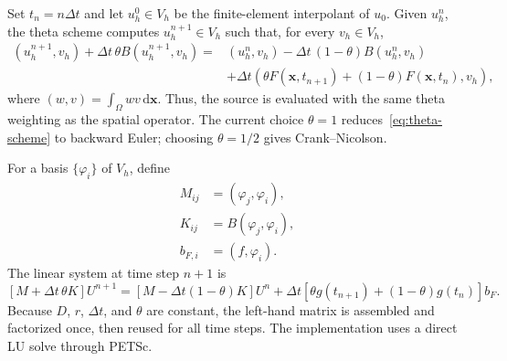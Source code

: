 \documentclass[11pt]{article}
\newcommand{\dd}{\,\mathrm{d}}
\begin{document}
Set \(t_n=n\Delta t\) and let \(u_h^0\in V_h\) be the finite-element
interpolant of \(u_0\).  Given \(u_h^n\), the theta scheme computes
\(u_h^{n+1}\in V_h\) such that, for every \(v_h\in V_h\),
\begin{align}
  (u_h^{n+1},v_h)
  + \Delta t\,\theta B(u_h^{n+1},v_h)
  ={}&(u_h^n,v_h)
  - \Delta t\,(1-\theta)B(u_h^n,v_h)
  \nonumber\\
  &+\Delta t\left(
      \theta F(\boldsymbol{x},t_{n+1})
      +(1-\theta)F(\boldsymbol{x},t_n),v_h
    \right),
  \label{eq:theta-scheme}
\end{align}
where \((w,v)=\int_\Omega wv\dd\boldsymbol{x}\).  Thus, the source is
evaluated with the same theta weighting as the spatial operator.  The current
choice \(\theta=1\) reduces~\eqref{eq:theta-scheme} to backward Euler; choosing
\(\theta=1/2\) gives Crank--Nicolson.

For a basis \(\{\varphi_i\}\) of \(V_h\), define
\begin{align}
  M_{ij} &= (\varphi_j,\varphi_i),\\
  K_{ij} &= B(\varphi_j,\varphi_i),\\
  b_{F,i} &= (f,\varphi_i).
\end{align}
The linear system at time step \(n+1\) is
\begin{equation}
  \left[M+\Delta t\,\theta K\right]U^{n+1}
  = \left[M-\Delta t(1-\theta)K\right]U^n
    +\Delta t\left[
      \theta g(t_{n+1})+(1-\theta)g(t_n)
    \right]b_F.
\end{equation}
Because \(D\), \(r\), \(\Delta t\), and \(\theta\) are constant, the
left-hand matrix is assembled and factorized once, then reused for all time
steps.  The implementation uses a direct LU solve through PETSc.
\end{document}

